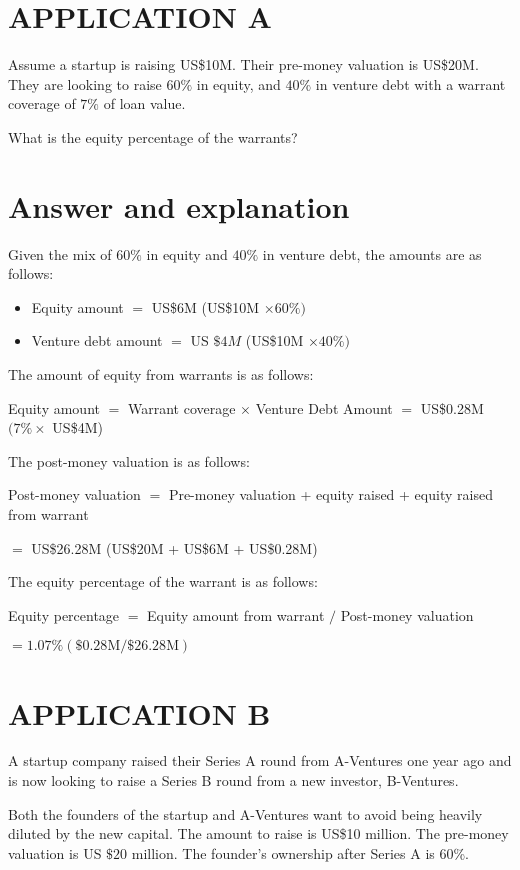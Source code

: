 \documentclass[11pt]{article}
\begin{document}
\section*{APPLICATION A}
Assume a startup is raising US\$10M. Their pre-money valuation is US\$20M. They are looking to raise $60 \%$ in equity, and $40 \%$ in venture debt with a warrant coverage of $7 \%$ of loan value.

What is the equity percentage of the warrants?

\section*{Answer and explanation}
Given the mix of $60 \%$ in equity and $40 \%$ in venture debt, the amounts are as follows:

\begin{itemize}
  \item Equity amount $=$ US\$6M (US\$10M $\times 60 \%)$
  \item Venture debt amount $=$ US $\$ 4 M$ (US\$10M $\times 40 \%)$
\end{itemize}

The amount of equity from warrants is as follows:

Equity amount $=$ Warrant coverage $\times$ Venture Debt Amount $=$ US\$0.28M $(7 \% \times$ US\$4M)

The post-money valuation is as follows:

Post-money valuation $=$ Pre-money valuation + equity raised + equity raised from warrant

$=$ US\$26.28M (US\$20M + US\$6M + US\$0.28M)

The equity percentage of the warrant is as follows:

Equity percentage $=$ Equity amount from warrant $/$ Post-money valuation

$=1.07 \%(\$ 0.28 \mathrm{M} / \$ 26.28 \mathrm{M})$

\section*{APPLICATION B}
A startup company raised their Series A round from A-Ventures one year ago and is now looking to raise a Series B round from a new investor, B-Ventures.

Both the founders of the startup and A-Ventures want to avoid being heavily diluted by the new capital. The amount to raise is US\$10 million. The pre-money valuation is US $\$ 20$ million. The founder's ownership after Series A is 60\%.
\end{document}

